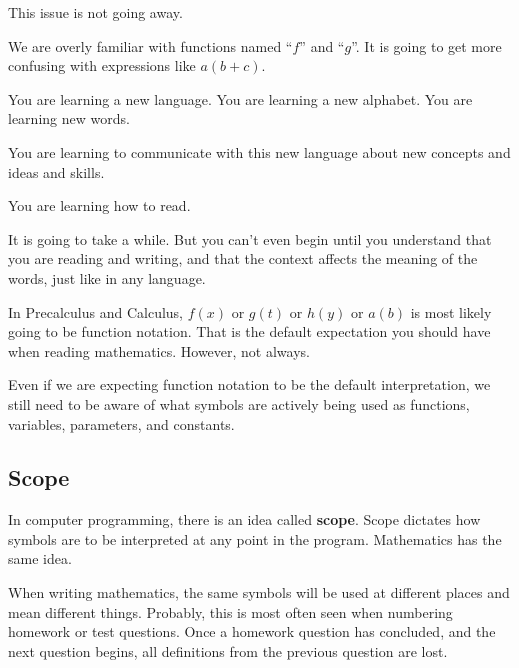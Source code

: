 \documentclass{ximera}
\begin{document}
This issue is not going away. 


We are overly familiar with functions named ``$f$'' and ``$g$''.  It is going to get more confusing with expressions like $a(b+c)$.




You are learning a new language.  You are learning a new alphabet.  You are learning new words. 

You are learning to communicate with this new language about new concepts and ideas and skills.  


You are learning how to read. 


It is going to take a while.  But you can't even begin until you understand that you are reading and writing, and that the context affects the meaning of the words, just like in any language.



In Precalculus and Calculus, $f(x)$ or $g(t)$ or $h(y)$ or $a(b)$ is most likely going to be function notation.  That is the default expectation you should have when reading mathematics. However, not always.


Even if we are expecting function notation to be the default interpretation, we still need to be aware of what symbols are actively being used as functions, variables, parameters, and constants.


\subsection*{Scope}

In computer programming, there is an idea called \textbf{scope}. Scope dictates how symbols are to be interpreted at any point in the program. Mathematics has the same idea.

When writing mathematics, the same symbols will be used at different places and mean different things.  Probably, this is most often seen when numbering homework or test questions.  Once a homework question has concluded, and the next question begins, all definitions from the previous question are lost. 
\end{document}
